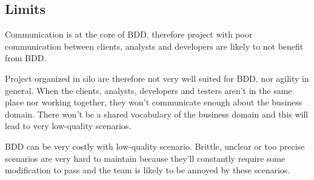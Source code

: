 \subsection{Limits}\label{subsec:bdd-limits}

Communication is at the core of BDD, therefore project with poor
communication between clients, analysts and developers are likely to not
benefit from BDD\@.

Project organized in silo are therefore not very well suited for BDD, nor
agility in general.
When the clients, analysts, developers and testers aren't in the same place
nor working together, they won't communicate enough about the business domain.
There won't be a shared vocabulary of the business domain and this will lead
to very low-quality scenarios.

BDD can be very costly with low-quality scenario.
Brittle, unclear or too precise scenarios are very hard to maintain because
they'll constantly require some modification to pass and the team is likely
to be annoyed by these scenarios.

